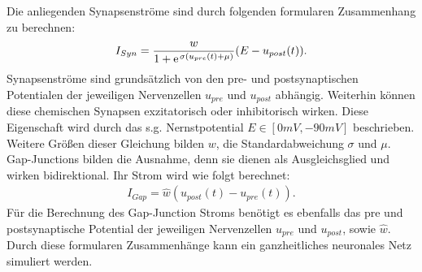 	Die anliegenden Synapsenströme sind durch folgenden formularen Zusammenhang zu berechnen:
	\begin{align}
		\label{eq:chem_syn_current}
		I_{Syn} = \frac{w}{1 + \e^{\sigma(u_{pre}(t) + \mu)}}(E - u_{post}(t))\text{.}
	\end{align}
	Synapsenströme sind grundsätzlich von den pre- und postsynaptischen Potentialen der jeweiligen Nervenzellen $u_{pre}$ und $u_{post}$ abhängig. Weiterhin können diese chemischen Synapsen exzitatorisch oder inhibitorisch wirken. Diese Eigenschaft wird durch das s.g. Nernstpotential $E\in[0mV, -90mV]$ beschrieben. Weitere Größen dieser Gleichung bilden $w$, die Standardabweichung $\sigma$ und $\mu$.\\
	Gap-Junctions bilden die Ausnahme, denn sie dienen als Ausgleichsglied und wirken bidirektional. Ihr Strom wird wie folgt berechnet:
	\begin{align}
		\label{eq:gap_syn_current}
		I_{Gap} = \hat{w}(u_{post}(t) - u_{pre}(t))\text{.}
	\end{align}
	Für die Berechnung des Gap-Junction Stroms benötigt es ebenfalls das pre und postsynaptische Potential der jeweiligen Nervenzellen $u_{pre}$ und $u_{post}$, sowie $\hat{w}$.\\	
	Durch diese formularen Zusammenhänge kann ein ganzheitliches neuronales Netz simuliert werden.
	
